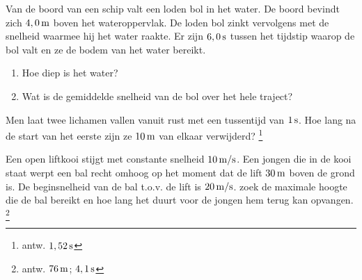 \documentclass{ximera}
\begin{document}
\begin{exercise} Van de boord van een schip valt een loden bol in het water. De
\mbox{boord} bevindt zich $4,0\rm\,m$ boven het wateroppervlak. De
loden bol zinkt vervolgens met de snelheid waarmee hij het water
raakte. Er zijn $6,0\rm\,s$ tussen het tijdstip waarop de bol valt
en ze de bodem van het water bereikt.
\begin{enumerate}
\item Hoe diep is het water?
\item Wat is de gemiddelde snelheid van de bol over het hele
traject?
\end{enumerate}

\end{exercise}

\begin{exercise} Men laat twee lichamen vallen vanuit rust met een tussentijd van
$1\rm\,s$. Hoe lang na de start van het eerste zijn ze $10\rm\,m$
van elkaar verwijderd? \footnote{antw. $1,52\rm\,s$}

\end{exercise}

\begin{exercise} Een open liftkooi stijgt met constante snelheid $10\rm\,m/s$.  Een jongen
die in de kooi staat werpt een bal recht omhoog op het moment dat de
lift $30\rm\,m$ boven de grond is. De beginsnelheid van de bal
t.o.v. de lift is $20\rm\,m/s$. zoek de maximale hoogte die de bal
bereikt en hoe lang het duurt voor de jongen hem terug kan opvangen.
\footnote{antw. $76\rm\,m$; $4,1\rm\,s$}



\end{exercise}
\end{document}
